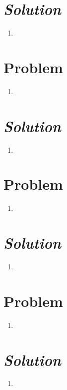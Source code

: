 \documentclass{article}
\begin{document}
\section*{\textit{Solution}} 
\begin{enumerate}[label=\alph*)]
	\item %
\end{enumerate}

\section*{Problem } 
\begin{enumerate}[label=\alph*)]
	\item %
\end{enumerate}
\section*{\textit{Solution}} 
\begin{enumerate}[label=\alph*)]
	\item %
\end{enumerate}

\section*{Problem } 
\begin{enumerate}[label=\alph*)]
	\item %
\end{enumerate}
\section*{\textit{Solution}} 
\begin{enumerate}[label=\alph*)]
	\item %
\end{enumerate}

\section*{Problem } 
\begin{enumerate}[label=\alph*)]
	\item %
\end{enumerate}
\section*{\textit{Solution}} 
\begin{enumerate}[label=\alph*)]
	\item %
\end{enumerate}
\end{document}
